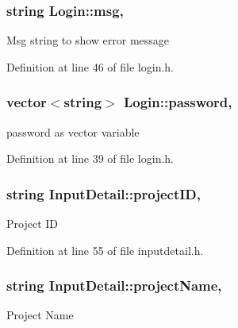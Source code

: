 \hypertarget{classLogin_a82a917399c1459896447984f576230bb}{
\subsubsection[{msg}]{\setlength{\rightskip}{0pt plus 5cm}string Login\-::msg\hspace{0.3cm}{\ttfamily [protected]}, {\ttfamily [inherited]}}}\label{classLogin_a82a917399c1459896447984f576230bb}
Msg string to show error message 

Definition at line 46 of file login.\-h.

\hypertarget{classLogin_ac097ff5d4f32b36b3f57e8e75fcf18a7}{
\subsubsection[{password}]{\setlength{\rightskip}{0pt plus 5cm}vector$<$string$>$ Login\-::password\hspace{0.3cm}{\ttfamily [protected]}, {\ttfamily [inherited]}}}\label{classLogin_ac097ff5d4f32b36b3f57e8e75fcf18a7}
password as vector variable 

Definition at line 39 of file login.\-h.

\hypertarget{classInputDetail_a08069ee622c626c038b821ddcc7427b4}{
\subsubsection[{project\-I\-D}]{\setlength{\rightskip}{0pt plus 5cm}string Input\-Detail\-::project\-I\-D\hspace{0.3cm}{\ttfamily [protected]}, {\ttfamily [inherited]}}}\label{classInputDetail_a08069ee622c626c038b821ddcc7427b4}
Project I\-D 

Definition at line 55 of file inputdetail.\-h.

\hypertarget{classInputDetail_aaaf51475a2a4ddbe34e38c96bdb45bad}{
\subsubsection[{project\-Name}]{\setlength{\rightskip}{0pt plus 5cm}string Input\-Detail\-::project\-Name\hspace{0.3cm}{\ttfamily [protected]}, {\ttfamily [inherited]}}}\label{classInputDetail_aaaf51475a2a4ddbe34e38c96bdb45bad}
Project Name 

